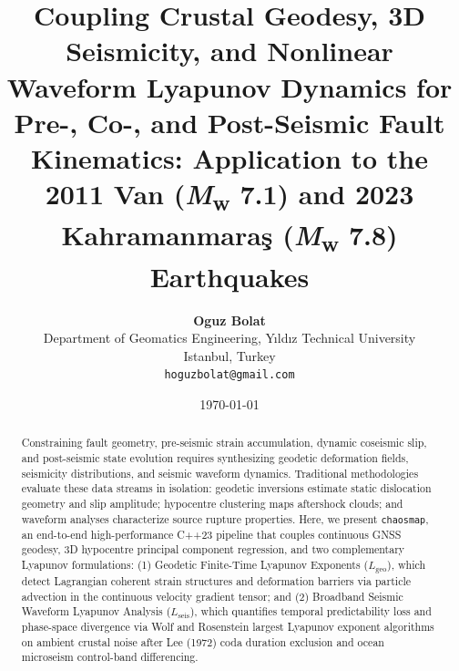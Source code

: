 \documentclass[11pt,a4paper]{article}
\title{\textbf{Coupling Crustal Geodesy, 3D Seismicity, and Nonlinear Waveform Lyapunov Dynamics for Pre-, Co-, and Post-Seismic Fault Kinematics: Application to the 2011 Van (\textit{M}\textsubscript{w} 7.1) and 2023 Kahramanmara\c{s} (\textit{M}\textsubscript{w} 7.8) Earthquakes}}
\author{\textbf{Oguz Bolat}\\
Department of Geomatics Engineering, Y{\i}ld{\i}z Technical University\\
Istanbul, Turkey\\
\texttt{hoguzbolat@gmail.com}}
\date{\today}
\begin{document}
\maketitle

\begin{abstract}
Constraining fault geometry, pre-seismic strain accumulation, dynamic coseismic slip, and post-seismic state evolution requires synthesizing geodetic deformation fields, seismicity distributions, and seismic waveform dynamics. Traditional methodologies evaluate these data streams in isolation: geodetic inversions estimate static dislocation geometry and slip amplitude; hypocentre clustering maps aftershock clouds; and waveform analyses characterize source rupture properties. Here, we present \texttt{chaosmap}, an end-to-end high-performance C++23 pipeline that couples continuous GNSS geodesy, 3D hypocentre principal component regression, and two complementary Lyapunov formulations: (1) Geodetic Finite-Time Lyapunov Exponents ($L_{\text{geo}}$), which detect Lagrangian coherent strain structures and deformation barriers via particle advection in the continuous velocity gradient tensor; and (2) Broadband Seismic Waveform Lyapunov Analysis ($L_{\text{seis}}$), which quantifies temporal predictability loss and phase-space divergence via Wolf and Rosenstein largest Lyapunov exponent algorithms on ambient crustal noise after Lee (1972) coda duration exclusion and ocean microseism control-band differencing.


\end{abstract}
\end{document}
